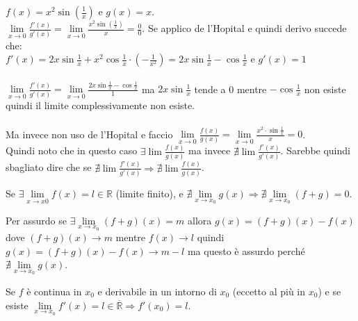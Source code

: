 \begin{example}
$f(x) = x^2\sin(\frac{1}{x})$ e $g(x) = x$.\\
$\lim\limits_{x\to 0}\frac{f'(x)}{g'(x)} = \lim\limits_{x\to 0}\frac{x^2 \sin(\frac{1}{x})}{x} = \frac{0}{0}$.
Se applico de l'Hopital e quindi derivo succede che: \\
$f'(x) = 2x\sin{\frac{1}{x}} + x^2\cos{\frac{1}{x}}\cdot(-\frac{1}{x^2}) = 2x\sin{\frac{1}{x}} - \cos{\frac{1}{x}}$ e $g'(x) = 1$\\\\
$\lim\limits_{x\to 0}\frac{f'(x)}{g'(x)} = \lim\limits_{x\to 0}\frac{2x\sin{\frac{1}{x}} - \cos{\frac{1}{x}}}{1}$ ma $2x\sin{\frac{1}{x}}$ tende a 0 mentre $- \cos{\frac{1}{x}}$ non esiste quindi il limite complessivamente non esiste.\\\\
Ma invece non uso de l'Hopital e faccio $\lim\limits_{x\to 0}\frac{f(x)}{g(x)} = \lim\limits_{x\to 0}\frac{x^2\cdot\sin{\frac{1}{x}}}{x} = 0$.\\
Quindi noto che in questo caso $\exists \lim\frac{f(x)}{g(x)}$ ma invece $\nexists \lim \frac{f'(x)}{g'(x)}$. Sarebbe quindi sbagliato dire che se $\nexists \lim \frac{f'(x)}{g'(x)} \Longrightarrow \nexists \lim \frac{f(x)}{g(x)}$.
\end{example}

\newpage
\begin{observation}
Se $\exists \lim\limits_{x\to x0}f(x) = l \in \mathbb{R}$ (limite finito), e $\nexists \lim\limits_{x\to x_0}g(x) \Longrightarrow \nexists \lim\limits_{x\to x_0}(f + g) = 0$.
\end{observation}
\begin{demostration}
Per assurdo se $\exists \lim\limits_{x\to x_0}(f + g)(x) = m$ allora $g(x) = (f + g)(x) - f(x)$ dove $(f + g)(x) \to m$ mentre $f(x) \to l$ quindi $g(x) = (f + g)(x) - f(x) \to m - l$ ma questo è assurdo perché $\nexists \lim\limits_{x\to x_0}g(x)$.
\end{demostration}

\begin{corollaries}
Se $f$ è continua in $x_0$ e derivabile in un intorno di $x_0$ (eccetto al più in $x_0$) e se esiste $\lim\limits_{x\to x_0}f'(x) = l \in \overline{\mathbb{R}} \Longrightarrow f'(x_0) = l$.
\end{corollaries}

